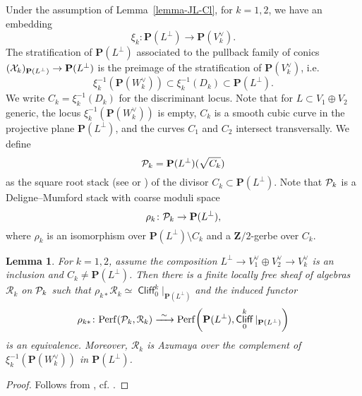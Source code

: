 \documentclass[11pt, reqno]{amsart}
\numberwithin{equation}{section}
\theoremstyle{plain}
\newtheorem{lemma}[theorem]{Lemma}
\theoremstyle{definition}
\newcommand{\Perf}{\mathrm{Perf}}
\newcommand{\svee}{\scriptscriptstyle\vee}
\DeclareMathOperator{\Cl}{\mathsf{Cliff}}
\newcommand{\vV}{V^{\svee}}
\newcommand{\vW}{W^{\svee}}
\newcommand{\cR}{\mathcal{R}}
\newcommand{\ccX}{\CMcal{X}}
\newcommand{\ccP}{\CMcal{P}}
\newcommand{\bZ}{\mathbf{Z}}
\newcommand{\bP}{\mathbf{P}}
\begin{document}
Under the assumption of Lemma~\ref{lemma-JL-Cl}, for $k=1,2$, we have an embedding 
\begin{equation*}
\xi_{k} \colon \bP(L^{\perp}) \to \bP(\vV_k). 
\end{equation*}
The stratification of $\bP(L^{\perp})$ associated to the 
pullback family of conics $(\ccX_k)_{\bP(L^\perp)} \to \bP(L^\perp)$ is the preimage  
of the stratification of $\bP(\vV_k)$, i.e. 
\begin{equation*}
\xi_k^{-1}(\bP(\vW_k)) \subset \xi_k^{-1}(D_k) \subset  \bP(L^\perp). 
\end{equation*} 
We write $C_k = \xi_k^{-1}(D_k)$ for the discriminant locus. 
Note that for $L \subset V_1 \oplus V_2$ generic, the locus $\xi_k^{-1}(\bP(\vW_k))$ is empty,  
$C_k$ is a smooth cubic curve in the projective plane $\bP(L^\perp)$, and the curves $C_1$ and $C_2$ intersect transversally.
We define 
\begin{equation*}
\ccP_k = \bP(L^{\perp})(\sqrt{C_k})
\end{equation*}
as the square root stack (see \cite[\S2.2]{root-stack-cadman} or \cite[Appendix B]{root-stack-vistoli}) 
of the divisor $C_k \subset \bP(L^{\perp})$.  
Note that $\ccP_k$ is a Deligne--Mumford stack with coarse moduli space 
\begin{equation*}
\rho_k \colon \ccP_k \to \bP(L^{\perp}), 
\end{equation*} 
where $\rho_k$ is an isomorphism over $\bP(L^{\perp}) \setminus C_k$ and a $\bZ/2$-gerbe over $C_k$. 

\begin{lemma} 
\label{lemma-Clk-Zk} 
For $k=1,2$, assume the composition $L^{\perp} \to \vV_1 \oplus \vV_2 \to \vV_k$ is an inclusion 
and $C_k \ne \bP(L^{\perp})$.
Then there is a finite locally free sheaf of algebras $\cR_k$ on $\ccP_k$ such that $\rho_{k*} \cR_k \simeq  \Cl_0^k\vert_{\bP(L^{\perp})}$ 
and the induced functor 
\begin{equation*}
\rho_{k*} \colon \Perf(\ccP_k ,\cR_k) \xrightarrow{\ \sim \ } \Perf {\left(\bP(L^{\perp}), \Cl_0^k\vert_{\bP(L^{\perp})} \right)}
\end{equation*} 
is an equivalence. Moreover, $\cR_k$ is Azumaya
over the complement of 
$\xi_k^{-1}(\bP(\vW_k))$ in $\bP(L^{\perp})$.
\end{lemma}

\begin{proof}
Follows from \cite[\S3.6]{kuznetsov08quadrics}, cf. \cite[Proposition 1.20]{ci-quadrics}. 
\end{proof}
\end{document}
